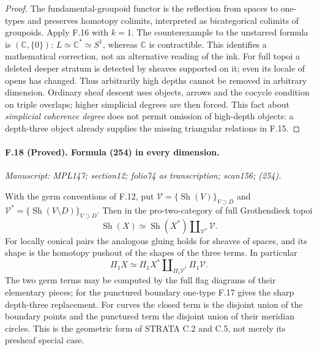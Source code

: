 \begin{proof}
The fundamental-groupoid functor is the reflection from spaces to
one-types and preserves homotopy colimits, interpreted as
bicategorical colimits of groupoids. Apply F.16 with $k=1$. The
counterexample to the unstarred formula is $(\mathbb C,\{0\})$:
$L\simeq\mathbb C^*\simeq S^1$, whereas $\mathbb C$ is contractible.
This identifies a mathematical correction, not an alternative reading
of the ink. For full topoi a deleted deeper stratum is detected by
sheaves supported on it; even its locale of opens has changed. Thus
arbitrarily high depths cannot be removed in arbitrary dimension.
Ordinary sheaf descent uses objects, arrows and the cocycle condition
on triple overlaps; higher simplicial degrees are then forced. This
fact about \emph{simplicial coherence degree} does not permit omission
of high-depth objects: a depth-three object already supplies the
missing triangular relations in F.15.
\end{proof}

\paragraph{F.18 (Proved). Formula (254) in every dimension.}
\textit{Manuscript: MPL147; section12; folio74 as transcription; scan156; (254).}

With the germ conventions of F.12, put
$\mathcal V=\{\operatorname{Sh}(V)\}_{V\supset D}$ and
$\mathcal V^*=\{\operatorname{Sh}(V\setminus D)\}_{V\supset D}$.
Then in the pro-two-category of full Grothendieck topoi
\[
 \operatorname{Sh}(X)\simeq
 \operatorname{Sh}(X^*)\amalg_{\mathcal V^*}\mathcal V .
\]
For locally conical pairs the analogous gluing holds for sheaves of
spaces, and its shape is the homotopy pushout of the shapes of the
three terms. In particular
\[
 \Pi_1X\simeq\Pi_1X^*\amalg_{\Pi_1\mathcal V^*}\Pi_1\mathcal V.
\]
The two germ terms may be computed by the full flag diagrams of their
elementary pieces; for the punctured boundary one-type F.17 gives the
sharp depth-three replacement. For curves the closed term is the
disjoint union of the boundary points and the punctured term the
disjoint union of their meridian circles. This is the geometric form
of STRATA C.2 and C.5, not merely its presheaf special case.

